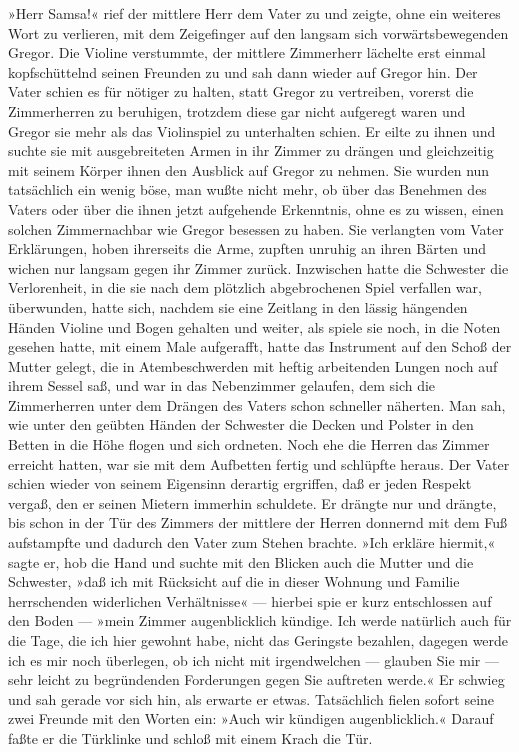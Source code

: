 »Herr Samsa!« rief der mittlere Herr dem Vater zu und zeigte, ohne ein
weiteres Wort zu verlieren, mit dem Zeigefinger auf den langsam sich
vorwärtsbewegenden Gregor. Die Violine verstummte, der mittlere
Zimmerherr lächelte erst einmal kopfschüttelnd seinen Freunden zu und
sah dann wieder auf Gregor hin. Der Vater schien es für nötiger zu
halten, statt Gregor zu vertreiben, vorerst die Zimmerherren zu
beruhigen, trotzdem diese gar nicht aufgeregt waren und Gregor sie mehr
als das Violinspiel zu unterhalten schien. Er eilte zu ihnen und suchte
sie mit ausgebreiteten Armen in ihr Zimmer zu drängen und gleichzeitig
mit seinem Körper ihnen den Ausblick auf Gregor zu nehmen. Sie wurden
nun tatsächlich ein wenig böse, man wußte nicht mehr, ob über das
Benehmen des Vaters oder über die ihnen jetzt aufgehende Erkenntnis,
ohne es zu wissen, einen solchen Zimmernachbar wie Gregor besessen zu
haben. Sie verlangten vom Vater Erklärungen, hoben ihrerseits die Arme,
zupften unruhig an ihren Bärten und wichen nur langsam gegen ihr Zimmer
zurück. Inzwischen hatte die Schwester die Verlorenheit, in die sie nach
dem plötzlich abgebrochenen Spiel verfallen war, überwunden, hatte sich,
nachdem sie eine Zeitlang in den lässig hängenden Händen Violine und
Bogen gehalten und weiter, als spiele sie noch, in die Noten gesehen
hatte, mit einem Male aufgerafft, hatte das Instrument auf den Schoß der
Mutter gelegt, die in Atembeschwerden mit heftig arbeitenden Lungen noch
auf ihrem Sessel saß, und war in das Nebenzimmer gelaufen, dem sich die
Zimmerherren unter dem Drängen des Vaters schon schneller näherten. Man
sah, wie unter den geübten Händen der Schwester die Decken und Polster
in den Betten in die Höhe flogen und sich ordneten. Noch ehe die Herren
das Zimmer erreicht hatten, war sie mit dem Aufbetten fertig und
schlüpfte heraus. Der Vater schien wieder von seinem Eigensinn derartig
ergriffen, daß er jeden Respekt vergaß, den er seinen Mietern immerhin
schuldete. Er drängte nur und drängte, bis schon in der Tür des Zimmers
der mittlere der Herren donnernd mit dem Fuß aufstampfte und dadurch den
Vater zum Stehen brachte. »Ich erkläre hiermit,« sagte er, hob die Hand
und suchte mit den Blicken auch die Mutter und die Schwester, »daß ich
mit Rücksicht auf die in dieser Wohnung und Familie herrschenden
widerlichen Verhältnisse« --- hierbei spie er kurz entschlossen auf den
Boden --- »mein Zimmer augenblicklich kündige. Ich werde natürlich auch
für die Tage, die ich hier gewohnt habe, nicht das Geringste bezahlen,
dagegen werde ich es mir noch überlegen, ob ich nicht mit irgendwelchen
--- glauben Sie mir --- sehr leicht zu begründenden Forderungen gegen Sie
auftreten werde.« Er schwieg und sah gerade vor sich hin, als erwarte er
etwas. Tatsächlich fielen sofort seine zwei Freunde mit den Worten ein:
»Auch wir kündigen augenblicklich.« Darauf faßte er die Türklinke und
schloß mit einem Krach die Tür.

